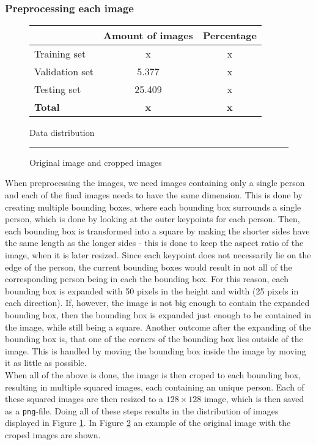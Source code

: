 \documentclass[main.tex]{subfiles}
\begin{document}
\subsubsection{Preprocessing each image}
\begin{figure}[H]
    \centering
    \begin{tabular}{l|c|c}
         & Amount of images & Percentage \\
        \hline
        Training set & x & x \\
        \hline
        Validation set & 5.377 & x \\
        \hline
        Testing set & 25.409 & x \\
        \hline
        \hline
        \textbf{Total} & \textbf{x} & \textbf{x} \\
        \hline
    \end{tabular}
    \caption{Data distribution}
    \label{tab:data_distribution}
\end{figure}
\begin{figure}[H]
    \centering
    \rule{1cm}{1cm} %
    \caption{Original image and cropped images}
    \label{fig:crop_img}
\end{figure}
When preprocessing the images, we need images containing only a single person and each of the final images needs to have the same dimension. This is done by creating multiple bounding boxes, where each bounding box surrounds a single person, which is done by looking at the outer keypoints for each person. Then, each bounding box is transformed into a square by making the shorter sides have the same length as the longer sides - this is done to keep the aspect ratio of the image, when it is later resized. Since each keypoint does not necessarily lie on the edge of the person, the current bounding boxes would result in not all of the corresponding person being in each the bounding box. For this reason, each bounding box is expanded with 50 pixels in the height and width (25 pixels in each direction). If, however, the image is not big enough to contain the expanded bounding box, then the bounding box is expanded just enough to be contained in the image, while still being a square. Another outcome after the expanding of the bounding box is, that one of the corners of the bounding box lies outside of the image. This is handled by moving the bounding box inside the image by moving it as little as possible. \\
When all of the above is done, the image is then croped to each bounding box, resulting in multiple squared images, each containing an unique person. Each of these squared images are then resized to a $128 \times 128$ image, which is then saved as a \texttt{png}-file. Doing all of these steps results in the distribution of images displayed in Figure \ref{tab:data_distribution}. In Figure \ref{fig:crop_img} an example of the original image with the croped images are shown.
\end{document}
